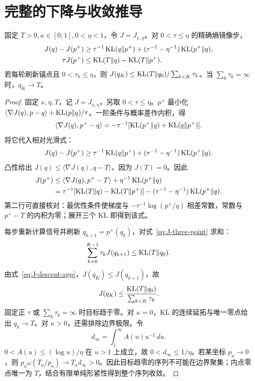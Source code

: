 \section{完整的下降与收敛推导}
\begin{theorem}
固定 $T>0,\kappa\in[0,1],0<\eta<1$，令 $J=J_{\kappa,\eta}$。对 $0<\tau\le\eta$ 的精确熵镜像步，
\begin{align}
J(q)-J(p^+)&\ge\tau^{-1}\operatorname{KL}(q\Vert p^+)+(\tau^{-1}-\eta^{-1})\operatorname{KL}(p^+\Vert q),\\
\tau J(p^+)&\le\operatorname{KL}(T\Vert q)-\operatorname{KL}(T\Vert p^+).
\end{align}
若每轮刷新锚点且 $0<\tau_k\le\eta$，则 $J(q_K)\le\operatorname{KL}(T\Vert q_0)/\sum_{k<K}\tau_k$。当 $\sum_k\tau_k=\infty$ 时，$q_K\to T$。
\end{theorem}
\begin{proof}
固定 $\kappa,\eta,T$，记 $J=J_{\kappa,\eta}$，另取 $0<\tau\le\eta$。$p^+$ 最小化 $\langle\nabla J(q),p-q\rangle+\operatorname{KL}(p\Vert q)/\tau$。一阶条件与概率差作内积，得
\begin{equation}
\langle\nabla J(q),p^+-q\rangle
=-\tau^{-1}[\operatorname{KL}(p^+\Vert q)+\operatorname{KL}(q\Vert p^+)].
\end{equation}
将它代入相对光滑式：
\begin{equation}
J(q)-J(p^+)\ge\tau^{-1}\operatorname{KL}(q\Vert p^+)
+(\tau^{-1}-\eta^{-1})\operatorname{KL}(p^+\Vert q).
\label{eq:J-descent-app}
\end{equation}
凸性给出 $J(q)\le\langle\nabla J(q),q-T\rangle$，因为 $J(T)=0$。因此
\begin{align}
J(p^+)
&\le\langle\nabla J(q),p^+-T\rangle+\eta^{-1}\operatorname{KL}(p^+\Vert q)\\
&=\tau^{-1}[\operatorname{KL}(T\Vert q)-\operatorname{KL}(T\Vert p^+)]
-(\tau^{-1}-\eta^{-1})\operatorname{KL}(p^+\Vert q).
\label{eq:J-three-point}
\end{align}
第二行可直接核对：最优性条件使梯度与 $-\tau^{-1}\log(p^+/q)$ 相差常数，常数与 $p^+-T$ 的内积为零；展开三个 KL 即得到该式。

每步重新计算信号并刷新 $q_{k+1}=p^+(q_k)$，对式~\eqref{eq:J-three-point} 求和：
\begin{equation}
\sum_{k=0}^{K-1}\tau_kJ(q_{k+1})\le\operatorname{KL}(T\Vert q_0).
\end{equation}
由式~\eqref{eq:J-descent-app}，$J(q_K)\le J(q_{k+1})$，故
\begin{equation}
J(q_K)\le\frac{\operatorname{KL}(T\Vert q_0)}{\sum_{k<K}\tau_k}.
\end{equation}
固定正 $\tau$ 或 $\sum_k\tau_k=\infty$ 时目标趋于零。对 $\kappa=0$，KL 的连续延拓与唯一零点给出 $q_k\to T$。对 $\kappa>0$，还需排除边界极限。令
\begin{equation}
d_\infty=\int_1^\infty A(u)u^{-2}\,du.
\end{equation}
$0<A(u)\le(\log u)/\eta$ 在 $u>1$ 上成立，故 $0<d_\infty\le1/\eta$。若某坐标 $p_a\to0$，则 $p_a\omega(T_a/p_a)\to T_ad_\infty>0$。因此目标趋零的序列不可能在边界聚集；内点零点唯一为 $T$，结合有限单纯形紧性得到整个序列收敛。
\end{proof}

